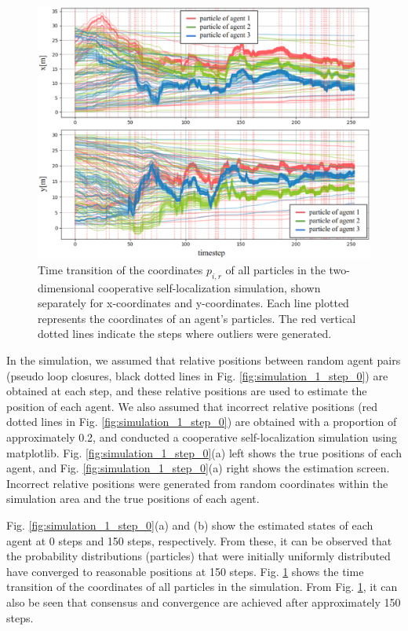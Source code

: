 \documentclass[a4paper,fleqn,10pt,twocolumn]{SICE_ISCS}
\begin{document}
\begin{figure}[H]
	\begin{center}
		\includegraphics[width=\linewidth]{Fig/2d_plot.eps}
		\caption{Time transition of the coordinates $p_{i,r}$ of all particles in the two-dimensional cooperative self-localization simulation, shown separately for x-coordinates and y-coordinates.
    Each line plotted represents the coordinates of an agent's particles.
    The red vertical dotted lines indicate the steps where outliers were generated.}
		\label{fig:plot_1}
	\end{center}
	\vspace{-2mm}
\end{figure}

In the simulation, we assumed that relative positions between random agent pairs (pseudo loop closures, black dotted lines in Fig. \ref{fig:simulation_1_step_0}) are obtained at each step, and these relative positions are used to estimate the position of each agent.
We also assumed that incorrect relative positions (red dotted lines in Fig. \ref{fig:simulation_1_step_0}) are obtained with a proportion of approximately 0.2, and conducted a cooperative self-localization simulation using matplotlib.
Fig. \ref{fig:simulation_1_step_0}(a) left shows the true positions of each agent, and Fig. \ref{fig:simulation_1_step_0}(a) right shows the estimation screen.
Incorrect relative positions were generated from random coordinates within the simulation area and the true positions of each agent.


Fig. \ref{fig:simulation_1_step_0}(a) and (b) show the estimated states of each agent at 0 steps and 150 steps, respectively.
From these, it can be observed that the probability distributions (particles) that were initially uniformly distributed have converged to reasonable positions at 150 steps.
Fig. \ref{fig:plot_1} shows the time transition of the coordinates of all particles in the simulation.
From Fig. \ref{fig:plot_1}, it can also be seen that consensus and convergence are achieved after approximately 150 steps.
\end{document}
